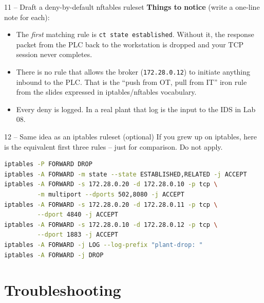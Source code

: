 \documentclass[11pt,a4paper]{article}
\begin{document}
\begin{stepbox}{11 -- Draft a deny-by-default nftables ruleset}
\textbf{Things to notice} (write a one-line note for each):
\begin{itemize}\setlength{\itemsep}{2pt}
  \item The \emph{first} matching rule is \texttt{ct state established}.
        Without it, the response packet from the PLC back to the
        workstation is dropped and your TCP session never completes.
  \item There is no rule that allows the broker
        (\texttt{172.28.0.12}) to initiate anything inbound to the PLC.
        That is the ``push from OT, pull from IT'' iron rule from the
        slides expressed in iptables/nftables vocabulary.
  \item Every deny is logged. In a real plant that log is the input to
        the IDS in Lab 08.
\end{itemize}
\end{stepbox}

\begin{stepbox}{12 -- Same idea as an iptables ruleset (optional)}
If you grew up on iptables, here is the equivalent first three rules --
just for comparison. Do not apply.
\begin{lstlisting}[language=bash]
iptables -P FORWARD DROP
iptables -A FORWARD -m state --state ESTABLISHED,RELATED -j ACCEPT
iptables -A FORWARD -s 172.28.0.20 -d 172.28.0.10 -p tcp \
         -m multiport --dports 502,8080 -j ACCEPT
iptables -A FORWARD -s 172.28.0.20 -d 172.28.0.11 -p tcp \
         --dport 4840 -j ACCEPT
iptables -A FORWARD -s 172.28.0.10 -d 172.28.0.12 -p tcp \
         --dport 1883 -j ACCEPT
iptables -A FORWARD -j LOG --log-prefix "plant-drop: "
iptables -A FORWARD -j DROP
\end{lstlisting}
\end{stepbox}

\section*{Troubleshooting}
\end{document}

